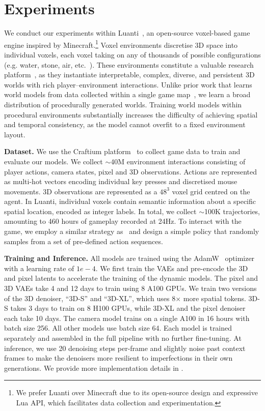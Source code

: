 \documentclass{article}
\theoremstyle{plain}
\theoremstyle{definition}
\theoremstyle{remark}
\begin{document}
\vspace{-0.24cm}
\section{Experiments}


We conduct our experiments within Luanti~\citep{luanti2024}, an open-source voxel-based game engine inspired by Minecraft.\footnote{We prefer Luanti over Minecraft due to its open-source design and expressive Lua API, which facilitates data collection and experimentation.} Voxel environments discretise 3D space into individual voxels, each voxel taking on any of thousands of possible configurations (e.g. water, stone, air, etc.\ ). These environments constitute a valuable research platform~\citep{malagon2025craftium,fan2022minedojo,guss2019minerl,baker2022video}, as they instantiate interpretable, complex, diverse, and persistent 3D worlds with rich player–environment interactions. Unlike prior work that learns world models from data collected within a single game map~\citep{alonso2024diffusion,kanervisto2025world}, we learn a broad distribution of procedurally generated worlds. Training world models within procedural environments substantially increases the difficulty of achieving spatial and temporal consistency, as the model cannot overfit to a fixed environment layout.


\textbf{Dataset.} We use the Craftium platform~\citep{malagon2025craftium} to collect game data to train and evaluate our models. We collect $\sim$40M environment interactions consisting of player actions, camera states, pixel and 3D observations. Actions are represented as multi-hot vectors encoding individual key presses and discretised mouse movements. 3D observations are represented as a $48^3$ voxel grid centred on the agent. In Luanti, individual voxels contain semantic information about a specific spatial location, encoded as integer labels. In total, we collect $\sim$100K trajectories, amounting to 460 hours of gameplay recorded at 24Hz. 
To interact with the game, we employ a similar strategy as~\citep{yu2025gamefactory} and design a simple policy that randomly samples from a set of pre-defined action sequences. %

\textbf{Training and Inference.} All models are trained using the AdamW~\citep{loshchilov2018decoupled} optimizer with a learning rate of $1e-4$. We first train the VAEs and pre-encode the 3D and pixel latents to accelerate the training of the dynamic models. The pixel and 3D VAEs take 4 and 12 days to train using 8 A100 GPUs. We train two versions of the 3D denoiser, ``3D-S'' and ``3D-XL'', which uses 8$\times$ more spatial tokens. 3D-S takes 3 days to train on 8 H100 GPUs, while 3D-XL and the pixel denoiser each take 10 days. The camera model trains on a single A100 in 16 hours with batch size 256. All other models use batch size 64. Each model is trained separately and assembled in the full pipeline with no further fine-tuning. At inference, we use 20 denoising steps per-frame and slightly noise past context frames to make the denoisers more resilient to imperfections in their own generations. We provide more implementation details in .
\end{document}
